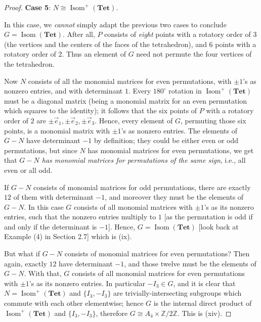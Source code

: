 \documentclass[leqno]{book}
\begin{document}
\begin{proof}
\noindent\textbf{Case 5}: \emph{$N\cong\operatorname{Isom}^+(\mathbf{Tet})$.}

In this case, we \emph{cannot} simply adapt the previous two cases to conclude $G=\operatorname{Isom}(\mathbf{Tet})$.  After all, $P$ consists of \emph{eight} points with a rotatory order of $3$ (the vertices and the centers of the faces of the tetrahedron), and $6$ points with a rotatory order of $2$.  Thus an element of $G$ need not permute the four vertices of the tetrahedron.

Now $N$ consists of all the monomial matrices for even permutations, with $\pm 1$'s as nonzero entries, and with determinant $1$.  Every $180^\circ$ rotation in $\operatorname{Isom}^+(\mathbf{Tet})$ must be a diagonal matrix (being a monomial matrix for an even permutation which squares to the identity); it follows that the six points of $P$ with a rotatory order of $2$ are $\pm\vec e_1,\pm\vec e_2,\pm\vec e_3$.  Hence, every element of $G$, permuting those six points, is a monomial matrix with $\pm 1$'s as nonzero entries.  The elements of $G-N$ have determinant $-1$ by definition; they could be either even or odd permutations, but since $N$ has monomial matrices for even permutations, we get that \emph{$G-N$ has monomial matrices for permutations of the same sign}, i.e., all even or all odd.

If $G-N$ consists of monomial matrices for odd permutations, there are exactly $12$ of them with determinant $-1$, and moreover they must be the elements of $G-N$.  In this case $G$ consists of all monomial matrices with $\pm 1$'s as its nonzero entries, such that the nonzero entries multiply to $1$ [as the permutation is odd if and only if the determinant is $-1$].  Hence, $G=\operatorname{Isom}(\mathbf{Tet})$ [look back at Example (4) in Section 2.7] which is (ix).

But what if $G-N$ consists of monomial matrices for even permutations?  Then again, exactly $12$ have determinant $-1$, and those twelve must be the elements of $G-N$.  With that, $G$ consists of all monomial matrices for even permutations with $\pm 1$'s as its nonzero entries.  In particular $-I_3\in G$, and it is clear that $N=\operatorname{Isom}^+(\mathbf{Tet})$ and $\{I_3,-I_3\}$ are trivially-intersecting subgroups which commute with each other elementwise; hence $G$ is the internal direct product of $\operatorname{Isom}^+(\mathbf{Tet})$ and $\{I_3,-I_3\}$, therefore $G\cong A_4\times\mathbb Z/2\mathbb Z$.  This is (xiv).
\end{proof}
\end{document}
